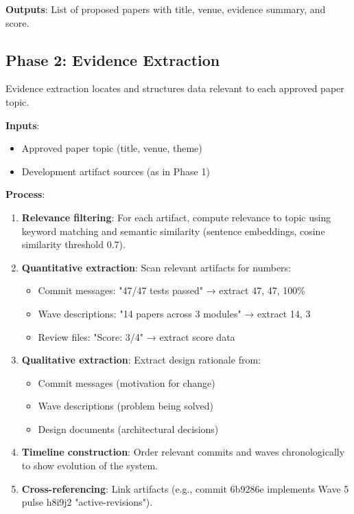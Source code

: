 \textbf{Outputs}: List of proposed papers with title, venue, evidence summary, and score.

\subsection{Phase 2: Evidence Extraction}

Evidence extraction locates and structures data relevant to each approved paper topic.

\textbf{Inputs}:
\begin{itemize}
\item Approved paper topic (title, venue, theme)
\item Development artifact sources (as in Phase 1)
\end{itemize}

\textbf{Process}:
\begin{enumerate}
\item \textbf{Relevance filtering}: For each artifact, compute relevance to topic using keyword matching and semantic similarity (sentence embeddings, cosine similarity threshold 0.7).

\item \textbf{Quantitative extraction}: Scan relevant artifacts for numbers:
  \begin{itemize}
  \item Commit messages: "47/47 tests passed" → extract 47, 47, 100\%
  \item Wave descriptions: "14 papers across 3 modules" → extract 14, 3
  \item Review files: "Score: 3/4" → extract score data
  \end{itemize}

\item \textbf{Qualitative extraction}: Extract design rationale from:
  \begin{itemize}
  \item Commit messages (motivation for change)
  \item Wave descriptions (problem being solved)
  \item Design documents (architectural decisions)
  \end{itemize}

\item \textbf{Timeline construction}: Order relevant commits and waves chronologically to show evolution of the system.

\item \textbf{Cross-referencing}: Link artifacts (e.g., commit 6b9286e implements Wave 5 pulse h8i9j2 "active-revisions").
\end{enumerate}

